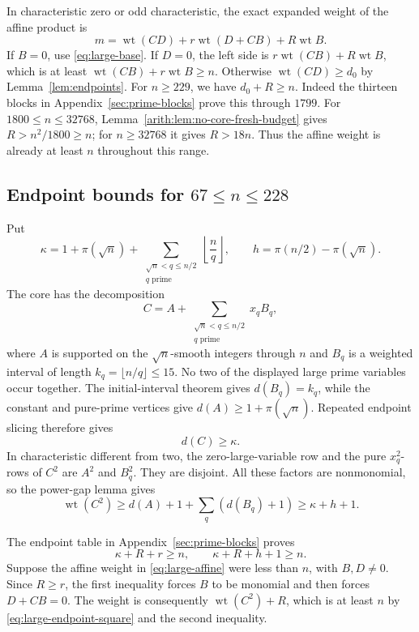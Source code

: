 \documentclass[11pt]{article}
\DeclareMathOperator{\wt}{wt}\DeclareMathOperator{\ord}{ord}
\numberwithin{equation}{section}
\theoremstyle{definition}\newtheorem{definition}[theorem]{Definition}
\theoremstyle{remark}\newtheorem{remark}[theorem]{Remark}
\begin{document}
In characteristic zero or odd characteristic, the exact expanded
weight of the affine product is
\begin{equation}\label{eq:large-affine}
 m=\wt(CD)+r\wt(D+CB)+R\wt B.
\end{equation}
If $B=0$, use \eqref{eq:large-base}. If $D=0$, the left side is
$r\wt(CB)+R\wt B$, which is at least
$\wt(CB)+r\wt B\ge n$. Otherwise $\wt(CD)\ge d_0$ by Lemma~\ref{lem:endpoints}.
For $n\ge229$, we have $d_0+R\ge n$. Indeed the thirteen blocks in
Appendix~\ref{sec:prime-blocks} prove this through $1799$.
For $1800\le n\le32768$, Lemma~\ref{arith:lem:no-core-fresh-budget}
gives $R>n^2/1800\ge n$; for $n\ge32768$ it gives $R>18n$.
Thus the affine weight is already at least $n$ throughout this range.

\subsection{Endpoint bounds for \texorpdfstring{$67\le n\le228$}{67 <= n <= 228}}

Put
\[
 \kappa=1+\pi(\sqrt n)+
       \sum_{\substack{\sqrt n<q\le n/2\\q\text{ prime}}}
          \left\lfloor\frac nq\right\rfloor,
 \qquad h=\pi(n/2)-\pi(\sqrt n).
\]
The core has the decomposition
\[
 C=A+\sum_{\substack{\sqrt n<q\le n/2\\q\text{ prime}}}x_qB_q,
\]
where $A$ is supported on the $\sqrt n$-smooth integers through $n$
and $B_q$ is a weighted interval of length $k_q=\lfloor n/q\rfloor\le15$.
No two of the displayed large prime variables occur together.
The initial-interval theorem gives $d(B_q)=k_q$, while the constant
and pure-prime vertices give $d(A)\ge1+\pi(\sqrt n)$.
Repeated endpoint slicing therefore gives
\[
 d(C)\ge\kappa.
\]
In characteristic different from two, the zero-large-variable row
and the pure $x_q^2$-rows of $C^2$ are $A^2$ and $B_q^2$.
They are disjoint. All these factors are nonmonomial, so the power-gap
lemma gives
\begin{equation}\label{eq:large-endpoint-square}
 \wt(C^2)\ge d(A)+1+\sum_q(d(B_q)+1)\ge\kappa+h+1.
\end{equation}

The endpoint table in Appendix~\ref{sec:prime-blocks} proves
\begin{equation}\label{eq:large-endpoint-budgets}
 \kappa+R+r\ge n,\qquad \kappa+R+h+1\ge n.
\end{equation}
Suppose the affine weight in \eqref{eq:large-affine} were less than
$n$, with $B,D\ne0$. Since $R\ge r$, the first inequality forces
$B$ to be monomial and then forces $D+CB=0$. The weight is consequently
$\wt(C^2)+R$, which is at least $n$ by
\eqref{eq:large-endpoint-square} and the second inequality.
\end{document}
